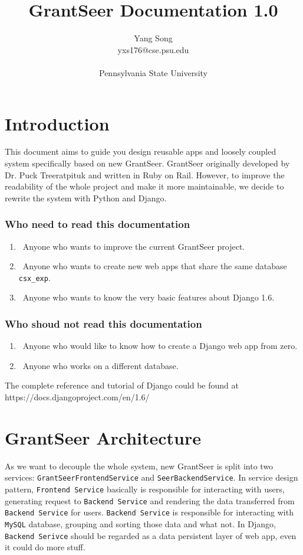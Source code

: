 \documentclass[12pt]{article}
\begin{document}
\title{GrantSeer Documentation 1.0}
\author{Yang Song \\ yxs176@cse.psu.edu \\\\ Pennsylvania State University}
\date{}
\maketitle

\section{Introduction}
This document aims to guide you design reusable apps and loosely coupled system specifically based on new GrantSeer. GrantSeer originally developed by Dr. Puck Treeratpituk and written in Ruby on Rail. However, to improve the readability of the whole project and make it more maintainable, we decide to rewrite the system with Python and Django.

\subsubsection*{Who need to read this documentation}
\begin{enumerate}
	\item\ Anyone who wants to improve the current GrantSeer project.
	\item\ Anyone who wants to create new web apps that share the same database \texttt{csx\_exp}.
	\item\ Anyone who wants to know the very basic features about Django 1.6.
\end{enumerate}

\subsubsection*{Who shoud not read this documentation}
\begin{enumerate}
	\item\ Anyone who would like to know how to create a Django web app from zero.
	\item\ Anyone who works on a different database.
\end{enumerate}

The complete reference and tutorial of Django could be found at \\ https://docs.djangoproject.com/en/1.6/


\section{GrantSeer Architecture}
As we want to decouple the whole system, new GrantSeer is split into two services: \texttt{GrantSeerFrontendService} and \texttt{SeerBackendService}. In service design pattern, \texttt{Frontend Service} basically is responsible for interacting with users, generating request to \texttt{Backend Service} and rendering the data transferred from \texttt{Backend Service} for users. \texttt{Backend Service} is responsible for interacting with \texttt{MySQL} database, grouping and sorting those data and what not. In Django, \texttt{Backend Serivce} should be regarded as a data persistent layer of web app, even it could do more stuff.
\end{document}
